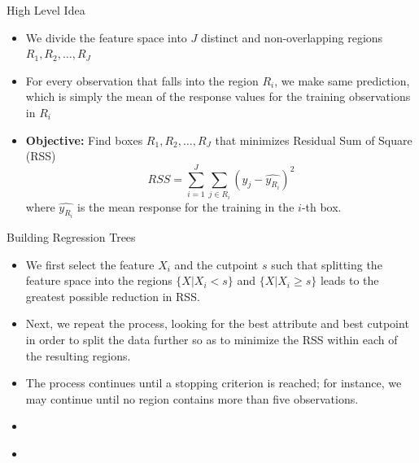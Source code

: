 \documentclass{beamer}
\begin{document}
\begin{frame}{High Level Idea}
    \begin{itemize}
        \item We divide the feature space into $J$ distinct and non-overlapping regions $R_1, R_2, \ldots, R_J$
        \item For every observation that falls into the region $R_i$, we make same prediction, which is simply the mean of the response values for the training observations in $R_i$
        \item {\bf Objective:} Find boxes $R_1, R_2, \ldots, R_J$  that minimizes Residual Sum of Square (RSS) 
                $$ RSS = \sum_{i=1}^{J} \sum_{j \in R_i} (y_j - \widehat{y_{R_i}})^2$$
            where $\widehat{y_{R_i}}$ is the mean response for the training in the $i$-th box.
    \end{itemize}
\end{frame}


\begin{frame}{Building Regression Trees}
    \begin{itemize}
        \item We first select the feature $X_i$ and the cutpoint $s$ such that splitting the feature space into the regions $\{X|X_i < s\}$ and $\{X|X_i \geq s\}$ leads to the greatest possible reduction in RSS.
        \item Next, we repeat the process, looking for the best attribute and best cutpoint in order to split the data further so as to minimize the RSS within each of the resulting regions.
        \item The process continues until a stopping criterion is reached; for instance, we may continue until no region contains more than five observations.
    \end{itemize}
\end{frame}


\begin{frame}{}
    \begin{itemize}
        \item 
    \end{itemize}
\end{frame}


\begin{frame}{}
    \begin{itemize}
        \item 
    \end{itemize}
\end{frame}
\end{document}
